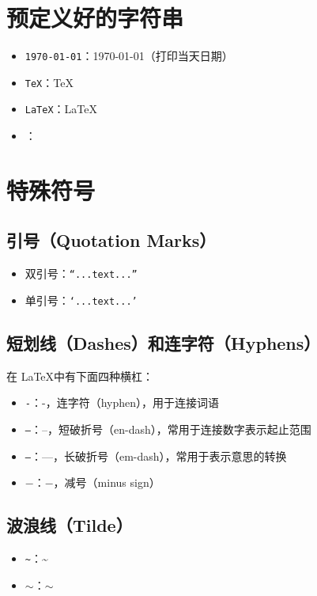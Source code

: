 \documentclass[UTF8]{ctexart}
\begin{document}
\section{预定义好的字符串}
\begin{itemize}
    \item \texttt{\today}：\today（打印当天日期）
    \item \texttt{\TeX}：\TeX
    \item \texttt{\LaTeX}：\LaTeX
    \item \texttt{\LaTeXe}：\LaTeXe
\end{itemize}

\section{特殊符号}
\subsection{引号（Quotation Marks）}
\begin{itemize}
    \item 双引号：\texttt{``...text...''}
    \item 单引号：\texttt{`...text...'}
\end{itemize}

\subsection{短划线（Dashes）和连字符（Hyphens）}
在 \LaTeX 中有下面四种横杠：
\begin{itemize}
    \item \texttt{-}：-，连字符（hyphen），用于连接词语
    \item \texttt{--}：--，短破折号（en-dash），常用于连接数字表示起止范围
    \item \texttt{---}：---，长破折号（em-dash），常用于表示意思的转换
    \item \texttt{$-$}：$-$，减号（minus sign）
\end{itemize}

\subsection{波浪线（Tilde）}
\begin{itemize}
    \item \texttt{\~{}}：\~{}
    \item \texttt{$\sim$}：$\sim$
\end{itemize}
\end{document}
